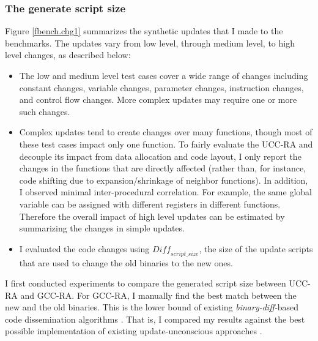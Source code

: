 \subsubsection{The generate script size}
Figure \ref{fbench.chg1} summarizes the synthetic updates that I made to the
benchmarks. The updates vary from low level, through medium level, to high level changes,
as described below:
\begin{itemize}
\itemsep 0pt
\item
The low and medium level test cases cover a wide range of changes
including constant changes, variable changes, parameter changes,
instruction changes, and control flow changes. More complex updates
may require one or more such changes.

\item 
Complex updates tend to create changes over many functions, though
most of these test cases impact only one function.  To fairly evaluate
the UCC-RA and decouple its impact from data allocation and code
layout, I only report the changes in the functions that are directly
affected (rather than, for instance, code shifting due to
expansion/shrinkage of neighbor functions).  In addition, I observed
minimal inter-procedural correlation. For example, the same global
variable can be assigned with different registers in different
functions.  Therefore the overall impact of high level updates can be
estimated by summarizing the changes in simple updates.

\item
I evaluated the code changes using $\textit{Diff}_{script\_size}$, the
size of the update scripts that are used to change the old binaries to the
new ones. 

\end{itemize}


I first conducted experiments to compare the generated script size
between UCC-RA and GCC-RA.  For GCC-RA, I manually find the best
match between the new and the old binaries. This is the lower bound of
existing {\em binary-diff-}based code dissemination algorithms
\cite{flink,related:script}. That is, I compared my results against the best possible
implementation of existing update-unconscious approaches
\cite{flink,related:script}. 

